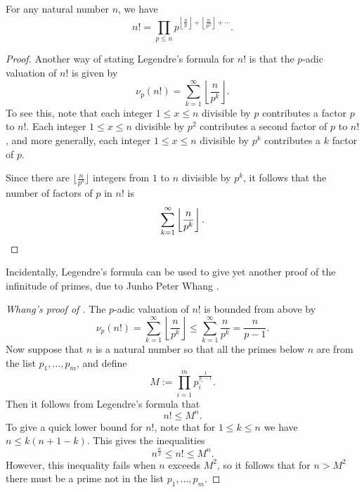 \begin{theorem}\label{theorem:legendres-formula}
  For any natural number $n$, we have
  \begin{equation*}
    n!=\prod_{p\leq n}p^{\left\lfloor\frac{n}{p}\right\rfloor + \left\lfloor\frac{n}{p^2}\right\rfloor + \cdots}.
  \end{equation*}
\end{theorem}

\begin{proof}
  Another way of stating Legendre's formula for $n!$ is that the $p$-adic valuation of $n!$ is given by
  \begin{equation*}
    \nu_p(n!) = \sum_{k=1}^\infty\left\lfloor\frac{n}{p^k}\right\rfloor.
  \end{equation*}
  To see this, note that each integer $1\leq x \leq n$ divisible by $p$ contributes a factor $p$ to $n!$. Each integer $1\leq x\leq n$ divisible by $p^2$ contributes a second factor of $p$ to $n!$, and more generally, each integer $1\leq x \leq n$ divisible by $p^k$ contributes a $k$\supth{} factor of $p$.

  Since there are $\bigl\lfloor\frac{n}{p^k}\bigr\rfloor$ integers from $1$ to $n$ divisible by $p^k$, it follows that the number of factors of $p$ in $n!$ is
  \begin{equation*}
    \sum_{k=1}^\infty\left\lfloor\frac{n}{p^k}\right\rfloor.\qedhere
  \end{equation*}
\end{proof}

Incidentally, Legendre's formula can be used to give yet another proof of the infinitude of primes, due to Junho Peter Whang \cite{whang2010}.

\begin{proof}[Whang's proof of ]
  The $p$-adic valuation of $n!$ is bounded from above by
  \begin{equation*}
    \nu_p(n!)= \sum_{k=1}^{\infty}\left\lfloor\frac{n}{p^k}\right\rfloor \leq \sum_{k=1}^{\infty}\frac{n}{p^k}=\frac{n}{p-1}.
  \end{equation*}
  Now suppose that $n$ is a natural number so that all the primes below $n$ are from the list $p_1,\ldots,p_m$, and define
  \begin{equation*}
    M := \prod_{i=1}^mp_i^{\frac{1}{p_i-1}}.
  \end{equation*}
  Then it follows from Legendre's formula that
  \begin{equation*}
    n!\leq M^n.
  \end{equation*}
  To give a quick lower bound for $n!$, note that for $1\leq k\leq n$ we have $n\leq k(n+1-k)$. This gives the inequalities
  \begin{equation*}
    n^{\frac{n}{2}}\leq n! \leq M^n.
  \end{equation*}
  However, this inequality fails when $n$ exceeds $M^2$, so it follows that for $n>M^2$ there must be a prime not in the list $p_1,\ldots,p_m$.
\end{proof}


